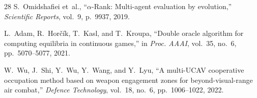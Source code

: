 \documentclass[12pt,a4paper]{article}
\begin{document}
\begin{thebibliography}{28}
S.~Omidshafiei et~al., ``$\alpha$-Rank: Multi-agent evaluation by
evolution,'' \emph{Scientific Reports}, vol.~9, p.~9937, 2019.

L.~Adam, R.~Hor{\v{c}}{\'i}k, T.~Kasl, and T.~Kroupa, ``Double oracle
algorithm for computing equilibria in continuous games,'' in \emph{Proc.
AAAI}, vol.~35, no.~6, pp.~5070--5077, 2021.

W.~Wu, J.~Shi, Y.~Wu, Y.~Wang, and Y.~Lyu, ``A multi-UCAV cooperative
occupation method based on weapon engagement zones for beyond-visual-range
air combat,'' \emph{Defence Technology}, vol.~18, no.~6, pp.~1006--1022,
2022.

\end{thebibliography}
\end{document}
